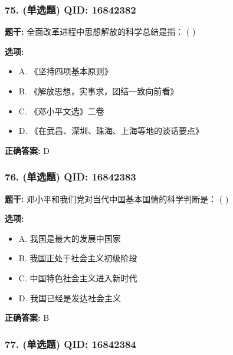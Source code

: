 \documentclass[12pt,UTF8]{ctexart}
\begin{document}
\subsubsection*{75. (单选题) \small QID: 16842382}

\textbf{题干:}
全面改革进程中思想解放的科学总结是指： ( )

\textbf{选项:}
\begin{itemize}[leftmargin=*]

  \item A. 《坚持四项基本原则》

  \item B. 《解放思想，实事求，团结一致向前看》

  \item C. 《邓小平文选》二卷

  \item D. 《在武昌、深圳、珠海、上海等地的谈话要点》

\end{itemize}

\textbf{正确答案:}
D

\vspace{0.3em}\hrulefill\vspace{0.7em}

\subsubsection*{76. (单选题) \small QID: 16842383}

\textbf{题干:}
邓小平和我们党对当代中国基本国情的科学判断是： ( )

\textbf{选项:}
\begin{itemize}[leftmargin=*]

  \item A. 我国是最大的发展中国家

  \item B. 我国正处于社会主义初级阶段

  \item C. 中国特色社会主义进入新时代

  \item D. 我国已经是发达社会主义

\end{itemize}

\textbf{正确答案:}
B

\vspace{0.3em}\hrulefill\vspace{0.7em}

\subsubsection*{77. (单选题) \small QID: 16842384}
\end{document}
